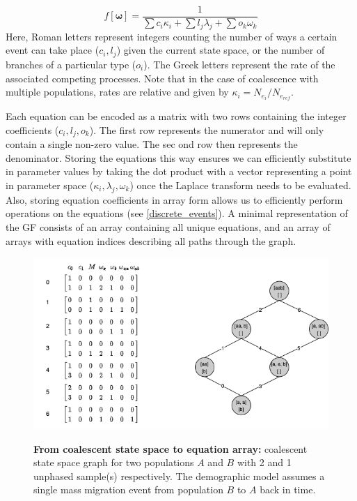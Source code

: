 \documentclass[10pt, a4]{article}
\begin{document}
\begin{equation} \label{eq:general_form}
f[\boldsymbol{\omega}] = \frac{1}{\sum c_i\kappa_i + \sum l_j\lambda_j + \sum o_k \omega_k} 
\end{equation}
Here, Roman letters represent integers counting the number of ways a certain event can take place ($c_i, l_j$) given the current state space, or the number of branches of a particular type ($o_i$). The Greek letters represent the rate of the associated competing processes. Note that in the case of coalescence with multiple populations, rates are relative and given by $\kappa_i = N_{e_{i}}/N_{e_{ref}}$.

Each equation can be encoded as a matrix with two rows containing the integer coefficients ($c_i, l_j, o_k$). The first row represents the numerator and will only contain a single non-zero value. The sec ond row then represents the denominator. Storing the equations this way ensures we can efficiently substitute in parameter values by taking the dot product with a vector representing a point in parameter space ($\kappa_i, \lambda_j, \omega_k$) once the Laplace transform needs to be evaluated. Also, storing equation coefficients in array form allows us to efficiently perform operations on the equations (see \ref{discrete_events}). A minimal representation of the GF consists of an array containing all unique equations, and an array of arrays with equation indices describing all paths through the graph. 

\begin{figure}
\begin{center}
\includegraphics[scale=0.5]{figures/temp2b.png} \label{fig:graph}
\end{center}
\caption{\textbf{From coalescent state space to equation array:} coalescent state space graph for two populations $A$ and $B$ with 2 and 1 unphased sample(s) respectively. The demographic model assumes a single mass migration event from population $B$ to $A$ back in time.}
\end{figure}
\end{document}
